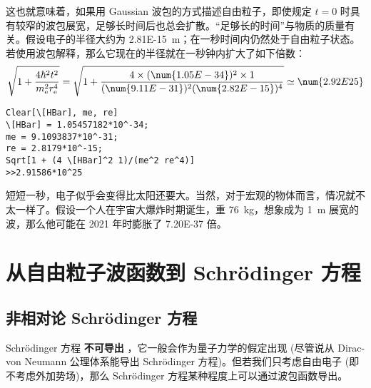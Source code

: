 这也就意味着，如果用 Gaussian 波包的方式描述自由粒子，即使规定 $t = 0$ 时具有较窄的波包展宽，足够长时间后也总会扩散。“足够长的时间”与物质的质量有关。假设电子的半径大约为 \SI{2.81E-15}{\metre}；在一秒时间内仍然处于自由粒子状态。若使用波包解释，那么它现在的半径就在一秒钟内扩大了如下倍数：
\begin{equation}
\sqrt{1 + \frac{4 \hbar^2 t^2}{m_\mathrm{e}^2 r_\mathrm{e}^4}} 
= \sqrt{1 + \frac
{4\times(\num{1.05E-34})^2\times1}
{(\num{9.11E-31})^2(\num{2.82E-15})^4}
}
\simeq \num{2.92E25}
\end{equation}
\begin{lstlisting}
Clear[\[HBar], me, re]
\[HBar] = 1.05457182*10^-34;
me = 9.1093837*10^-31;
re = 2.8179*10^-15;
Sqrt[1 + (4 \[HBar]^2 1)/(me^2 re^4)]
>>2.91586*10^25
\end{lstlisting}
短短一秒，电子似乎会变得比太阳还要大。当然，对于宏观的物体而言，情况就不太一样了。假设一个人在宇宙大爆炸时期诞生，重 \SI{76}{\kilo\gram}，想象成为 \SI{1}{\metre} 展宽的波，那么他可能在 2021 年时膨胀了 \num{7.20E-37} 倍。

\iffalse
目前为止，我们还不能说实物粒子波包的物理模型是错误的 (事实上，实物粒子波包模型确实是 Schr\"odinger 方程的解)。只有当物质质量足够大、初始时刻展宽足够宽时，波包能重现经典物理的图像。但想要通过波来刻画粒子的行为，似乎会在微观世界变得不太直观。我们会说这是朴素的波粒二象性的理解，它仍然是试图将粒子通过波的行为描述，而产生看似谬误的结论。

一种可能的理解是，所谓波性与粒性不应朴素地理解，物质的行为在长时间未观测时是不可知的；而在测量时，若使用检测波形的手段就会使得波函数坍缩到接近平面光波的形式；若使用检测粒子的手段则会使波函数接近 $\delta$ 函数的粒子形貌。这称为波包的收缩；依据一些量子力学表述，这比较接近关于波函数投影的假设。

但这不仅是 Gaussian 波包的困难。事实上，对于任意的 $A(k)$ 即任意波包，当时间足够长，波包总会弥散。这可以通过求取不确定度 $\langle x^2 \rangle - \langle x \rangle^2$ 给出；这需要使用到 Ehrenfest 定理。(Cohen-Tannoudji, LIII, Exercise 4)
\fi

\section{从自由粒子波函数到 Schr\"odinger 方程}

\subsection{非相对论 Schr\"odinger 方程}

Schr\"odinger 方程 \textbf{不可导出} ，它一般会作为量子力学的假定出现 (尽管说从 Dirac-von Neumann 公理体系能导出 Schr\"odinger 方程)。但若我们只考虑自由电子 (即不考虑外加势场)，那么 Schr\"odinger 方程某种程度上可以通过波包函数导出。

